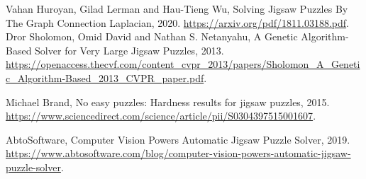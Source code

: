\documentclass{article}
\begin{document}
\clearpage
\begin{thebibliography}{9}

    Vahan Huroyan, Gilad   Lerman and Hau-Tieng Wu,
    Solving Jigsaw Puzzles By The Graph Connection Laplacian,
    2020.
    \url{https://arxiv.org/pdf/1811.03188.pdf}.
    Dror Sholomon, Omid David and Nathan S. Netanyahu,
    A Genetic Algorithm-Based Solver for Very Large Jigsaw Puzzles,
    2013.
    \url{https://openaccess.thecvf.com/content_cvpr_2013/papers/Sholomon_A_Genetic_Algorithm-Based_2013_CVPR_paper.pdf}.
  
    Michael Brand,
    No easy puzzles: Hardness results for jigsaw puzzles,
    2015.
    \url{https://www.sciencedirect.com/science/article/pii/S0304397515001607}.

    AbtoSoftware,
    Computer Vision Powers Automatic Jigsaw Puzzle Solver,
    2019.
    \url{https://www.abtosoftware.com/blog/computer-vision-powers-automatic-jigsaw-puzzle-solver}.
  
\end{thebibliography}
\end{document}

